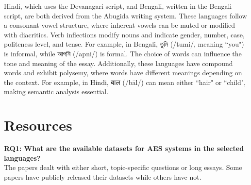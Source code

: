 \documentclass{article}
\begin{document}
Hindi, which uses the Devanagari script, and Bengali, written in the Bengali script, are both derived from the Abugida writing system. These languages follow a consonant-vowel structure, where inherent vowels can be muted or modified with diacritics. Verb inflections modify nouns and indicate gender, number, case, politeness level, and tense. For example, in Bengali, \textbengali{তুমি} (/tumi/, meaning ``you") is informal, while \textbengali{আপনি} (/apni/) is formal. The choice of words can influence the tone and meaning of the essay. Additionally, these languages have compound words and exhibit polysemy, where words have different meanings depending on the context. For example, in Hindi, \texthindi{बाल} (/bāl/) can mean either ``hair" or ``child", making semantic analysis essential.

	\section{Resources}
	\textbf{RQ1: What are the available datasets for AES systems in the selected languages?} \\
	The papers dealt with either short, topic-specific questions or long essays. Some papers have publicly released their datasets while others have not.
\end{document}
